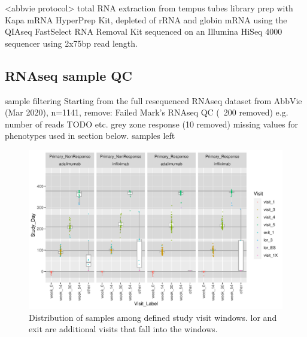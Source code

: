 \begin{outline}
%

\1 <abbvie protocol>
    \2 total RNA extraction from tempus tubes
    \2 library prep with Kapa mRNA HyperPrep Kit, depleted of rRNA and globin mRNA using the QIAseq FastSelect RNA Removal Kit 
    \2 sequenced on an Illumina HiSeq 4000 sequencer using 2x75bp read length.

\subsection{RNAseq sample QC}

\1 sample filtering
    \2 Starting from the full resequenced RNAseq dataset from AbbVie (Mar 2020), n=1141, remove:
    \2 Failed Mark’s RNAseq QC (~200 removed) e.g. number of reads TODO etc.
    \2 grey zone response (10 removed)
    \2 missing values for phenotypes used in section below.
     samples left

\begin{figure}
    \centering
    \includegraphics[width=1.0\textwidth,page=1]{mainmatter/figures/chapter_04/process_pheno.pheno_filtered_dge.Study_Day_vs_Visit_Label.pdf}
    \caption{Distribution of samples among defined study visit windows. lor and exit are additional visits that fall into the windows.}
    \label{fig:multipants_studyDay_boxplots}
\end{figure}


\end{outline}
